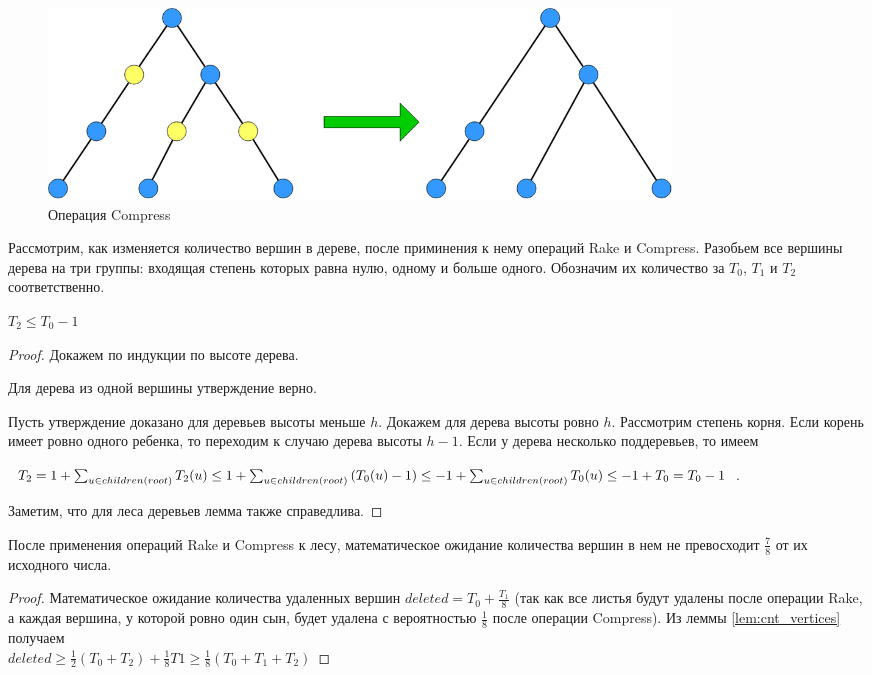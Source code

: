 \begin{figure}[h]
\centering
\includegraphics[width=0.8\textwidth]{pics/compress.png}
\caption{Операция Compress}
\label{pic:compress}
\end{figure}

Рассмотрим, как изменяется количество вершин в дереве, после приминения к нему операций Rake и Compress. 
Разобьем все вершины дерева на три группы: входящая степень которых равна нулю, одному и больше одного. Обозначим их количество за $T_0$, $T_1$ и $T_2$ соответственно.
\begin{lemma}
\label{lem:cnt_vertices}
  $T_2 \leq T_0 - 1$
\begin{proof}
  Докажем по индукции по высоте дерева. 
  
  Для дерева из одной вершины утверждение верно. 
  
  Пусть утверждение доказано для деревьев высоты меньше $h$. Докажем для дерева высоты ровно $h$. 
  Рассмотрим степень корня. Если корень имеет ровно одного ребенка, то переходим к случаю дерева высоты $h - 1$. Если у дерева несколько поддеревьев, 
  то имеем 
  
  $T_2 = 1 + \sum\nolimits_{u \in children(root)} {T_2 (u)} 
             \leq 1 + \sum\nolimits_{u \in children(root)} {(T_0 (u) - 1)} \\
             \leq -1 + \sum\nolimits_{u \in children(root)} {T_0 (u)} 
             \leq -1 + T_0 = T_0 - 1$. 
  
  Заметим, что для леса деревьев лемма также справедлива.
\end{proof}
\end{lemma}

\begin{lemma}
\label{lem:const_factor}
После применения операций Rake и Compress к лесу, математическое ожидание количества вершин в нем не превосходит $\frac{7}{8}$ от их исходного числа.
\begin{proof}
Математическое ожидание количества удаленных вершин $deleted = T_0 + \frac{T_1}{8}$ 
(так как все листья будут удалены после операции Rake, а каждая вершина, у которой ровно один сын, будет удалена с вероятностью $\frac{1}{8}$ после операции Compress). 
Из леммы \ref{lem:cnt_vertices} получаем\\ $deleted \geq \frac{1}{2} (T_0 + T_2) + \frac{1}{8} T1 \geq \frac{1}{8} (T_0 + T_1 + T_2)$
\end{proof}
\end{lemma}
 
